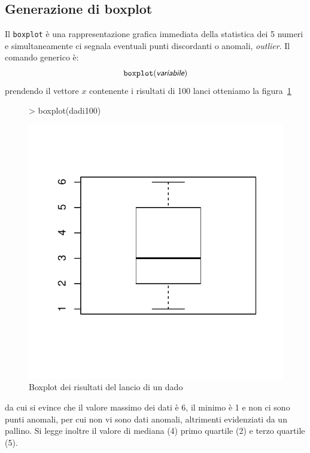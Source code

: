 \documentclass[onecolumn,12pt]{book}
\newcommand{\varia}[1]{\textsl{\textsf{#1}}}
\begin{document}
\subsection{Generazione di boxplot}

Il \texttt{boxplot}  \`e una rappresentazione grafica immediata della statistica dei 5 numeri e simultaneamente ci  segnala eventuali punti discordanti o anomali, {\it outlier}.
Il comando generico \`e: \begin{equation}\texttt{boxplot}(\varia{variabile})\end{equation}
prendendo il vettore $x$ contenente i risultati di 100 lanci
otteniamo la figura~\ref{fig:boxplotdado}
\begin{figure}[htbp]
\begin{center}
\begin{Schunk}
\begin{Sinput}
> boxplot(dadi100)
\end{Sinput}
\end{Schunk}
\includegraphics{RbookParte2-123}
\caption{Boxplot dei risultati del lancio di un dado}
\label{fig:boxplotdado}
\end{center}
\end{figure}
da cui si evince che il valore massimo dei dati \`e 6, il minimo \`e 1 e non ci sono punti anomali, per cui non vi sono dati anomali, altrimenti evidenziati da un pallino. Si legge inoltre il valore di mediana (4) primo quartile (2) e terzo quartile (5).
\end{document}
